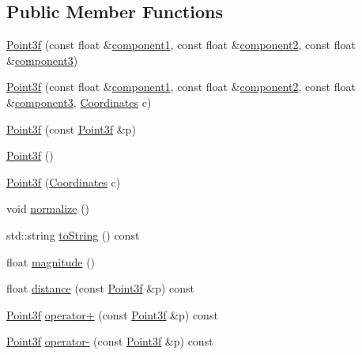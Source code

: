 \subsection*{Public Member Functions}
\begin{DoxyCompactItemize}
\item 
\hyperlink{classccmc_1_1_point3f_a7e22a8a8bab9a55b3d4465ddaaa4a5d5}{Point3f} (const float \&\hyperlink{classccmc_1_1_point3f_a3e9b0696019ec1577083dc8d2918ea46}{component1}, const float \&\hyperlink{classccmc_1_1_point3f_adc52014c3135cbf699d7785e901e18a3}{component2}, const float \&\hyperlink{classccmc_1_1_point3f_a9f6adb1d63a8d54913c30e1b62b118fd}{component3})
\item 
\hyperlink{classccmc_1_1_point3f_a960f33b6bf4fb7806d619eb0e30847db}{Point3f} (const float \&\hyperlink{classccmc_1_1_point3f_a3e9b0696019ec1577083dc8d2918ea46}{component1}, const float \&\hyperlink{classccmc_1_1_point3f_adc52014c3135cbf699d7785e901e18a3}{component2}, const float \&\hyperlink{classccmc_1_1_point3f_a9f6adb1d63a8d54913c30e1b62b118fd}{component3}, \hyperlink{classccmc_1_1_point3f_a41ca3743444f541586ededdd77c9762b}{Coordinates} c)
\item 
\hyperlink{classccmc_1_1_point3f_a960a82ef953ad1a41782d81e1e4b682f}{Point3f} (const \hyperlink{classccmc_1_1_point3f}{Point3f} \&p)
\item 
\hyperlink{classccmc_1_1_point3f_a9b7c056aafa9fdaa8ab2a08705232639}{Point3f} ()
\item 
\hyperlink{classccmc_1_1_point3f_a6d3a8a3071db8149dbde7536943ff5e4}{Point3f} (\hyperlink{classccmc_1_1_point3f_a41ca3743444f541586ededdd77c9762b}{Coordinates} c)
\item 
void \hyperlink{classccmc_1_1_point3f_aeaf24d6f3cdcaba79fb7d499a639b7e2}{normalize} ()
\item 
std\-::string \hyperlink{classccmc_1_1_point3f_afa17d5a8234404974d4a9b9342b01c23}{to\-String} () const 
\item 
float \hyperlink{classccmc_1_1_point3f_a71f9cc868f43146c8bf62eb877b0ce02}{magnitude} ()
\item 
float \hyperlink{classccmc_1_1_point3f_a3e277799d6824b4546a90ff91eadcbf4}{distance} (const \hyperlink{classccmc_1_1_point3f}{Point3f} \&p) const 
\item 
\hyperlink{classccmc_1_1_point3f}{Point3f} \hyperlink{classccmc_1_1_point3f_a2602962066457f7c3315bc3c6a023297}{operator+} (const \hyperlink{classccmc_1_1_point3f}{Point3f} \&p) const 
\item 
\hyperlink{classccmc_1_1_point3f}{Point3f} \hyperlink{classccmc_1_1_point3f_a06cb4bca3aa82073875a5f760e038333}{operator-\/} (const \hyperlink{classccmc_1_1_point3f}{Point3f} \&p) const 

\end{DoxyCompactItemize}
